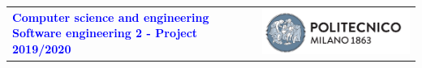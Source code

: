


\usepackage{eso-pic,graphicx}
\usepackage{float}
\usepackage[dvipsnames]{xcolor}
    \usepackage{listings}

\usepackage{hyperref}
\hypersetup{colorlinks,breaklinks,linkcolor=black,urlcolor=blue}



\begin{titlepage}




{\begin{table}[t!]
\centering
\begin{tabu} to \textwidth { X[1.3,r,p] X[1.7,l,p] }
\textcolor{Blue}
{\textbf{\small{Computer science and engineering Software engineering 2 - Project 2019/2020}}} & \includegraphics[scale=0.5]{Images/PolimiLogo}
\end{tabu}
\end{table}}~\\ [7cm]


\begin{flushleft}





\end{flushleft}
\end{titlepage}

